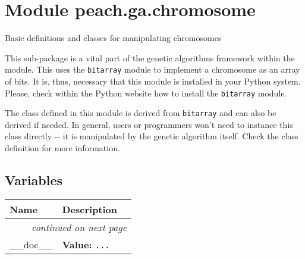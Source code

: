 %
%
%


\section{Module peach.ga.chromosome}

    \label{peach:ga:chromosome}

Basic definitions and classes for manipulating chromosomes

This sub-package is a vital part of the genetic algorithms framework within the
module. This uses the \texttt{bitarray} module to implement a chromosome as an array
of bits. It is, thus, necessary that this module is installed in your Python
system. Please, check within the Python website how to install the \texttt{bitarray}
module.

The class defined in this module is derived from \texttt{bitarray} and can also be
derived if needed. In general, users or programmers won't need to instance this
class directly -{}- it is manipulated by the genetic algorithm itself. Check the
class definition for more information.


  \subsection{Variables}

\begin{longtable}{|p{}|p{}|l}
\cline{1-2}
\cline{1-2} \centering \textbf{Name} & \centering \textbf{Description}& \\
\cline{1-2}
\endhead\cline{1-2}\multicolumn{3}{r}{\small\textit{continued on next page}}\\\endfoot\cline{1-2}
\endlastfoot\raggedright \_\-\_\-d\-o\-c\-\_\-\_\- & \raggedright \textbf{Value:} 
{\tt \texttt{...}}&\\
\cline{1-2}
\end{longtable}


